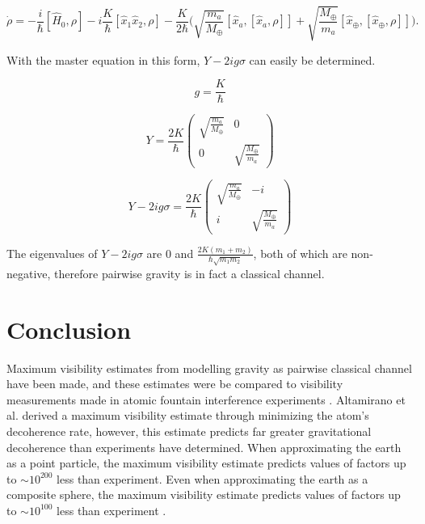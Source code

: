 \documentclass[aps, prd, superscriptaddress,twocolumn,amsmath,amssymb,nofootinbib]{revtex4-1}
\newcommand{\beq}{\begin{equation}}
\newcommand{\eeq}{\end{equation}}
\newcommand{\h}[1]{\hat#1{}}
\begin{document}
\beq
 \dot{\rho} = -\frac{i}{\hbar}[\h H_0, \rho] 
 - i\frac{K}{\hbar}[\h x_1 \h x_2, \rho]
 -\frac{K}{2\hbar}\bigg(\sqrt{\frac{m_a}{M_\oplus}}[\h x_a, [\h x_a,\rho]]
 + \sqrt{\frac{M_\oplus}{m_a}}[\h x_\oplus, [\h x_\oplus,\rho]]\bigg).
 \label{MasterEqn_EigenvalueGenForm}
 \eeq

With the master equation in this form, $Y-2ig\sigma$ can easily be determined.

\beq
g = \frac{K}{\hbar}
\eeq

\beq
Y = \frac{2K}{\hbar}\begin{pmatrix} 
\sqrt{\frac{m_a}{M_\oplus}} & 0 \\
0 & \sqrt{\frac{M_\oplus}{m_a}}
\end{pmatrix}
\eeq

\beq
Y-2ig\sigma =  \frac{2K}{\hbar}\begin{pmatrix} 
\sqrt{\frac{m_a}{M_\oplus}} & -i \\
i & \sqrt{\frac{M_\oplus}{m_a}}
\end{pmatrix}
\eeq

The eigenvalues of $Y-2ig\sigma$ are 0 and $\frac{2K(m_1 + m_2)}{\hbar \sqrt{m_1m_2}}$, both of which are non-negative, therefore pairwise gravity is in fact a classical channel.


\section{Conclusion}
Maximum visibility estimates from modelling gravity as pairwise classical channel have been made, and these estimates were be compared to visibility measurements made in atomic fountain interference experiments \cite{kovachy, sugarbaker}. Altamirano et al. derived a maximum visibility estimate through minimizing the atom's decoherence rate, however, this estimate predicts far greater gravitational decoherence than experiments have determined. When approximating the earth as a point particle, the maximum visibility estimate predicts values of factors up to $\sim 10^{200}$ less than experiment. Even when approximating the earth as a composite sphere, the maximum visibility estimate predicts values of factors up to $\sim 10^{100}$ less than experiment \cite{P3}.
\end{document}
